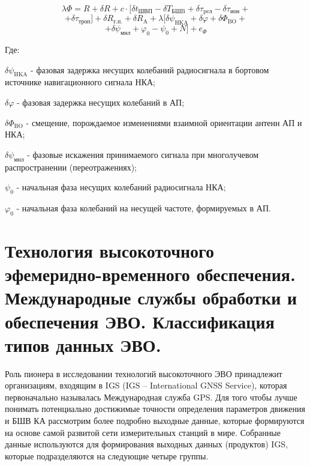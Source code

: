 \documentclass[14pt,a4paper,oneside]{extarticle}
\begin{document}
\[\lambda\Phi=R+\delta R+c\cdot[\delta t_{\text{ШВП}}-\delta T_{\text{БШB}}+\delta\tau_{\text{peл}}-\delta\tau_{\text{ион}}+\]
        \[+\delta\tau_{\text{троп}}]+\delta R_{\text{г.п.}}+\delta R_{\text{A}}+\lambda[\delta\psi_{\text{HKA}}+\delta\varphi+\delta\Phi_{\text{BO}}+\]
        \[+\delta\psi_{\text{мнл}}+\varphi_{0}-\psi_{0}+N]+e_{\Phi}\]

Где:

$\delta\psi_{\text{HKA}}$ - фазовая задержка несущих колебаний радиосигнала в бортовом источнике навигационного сигнала НКА;

$\delta\varphi$ - фазовая задержка несущих колебаний в АП;

$\delta\Phi_{\text{BO}}$ - смещение, порождаемое изменениями взаимной ориентации антенн АП и НКА;

$\delta\psi_{\text{мнл}}$ - фазовые искажения принимаемого сигнала при многолучевом распространении (переотражениях);

$\psi_{0}$ - начальная фаза несущих колебаний радиосигнала НКА;

$\varphi_{0}$ - начальная фаза колебаний на несущей частоте, формируемых в АП.

\section{Технология высокоточного эфемеридно-временного обеспечения. Международные службы обработки и обеспечения ЭВО. Классификация типов данных ЭВО.}

Роль пионера в исследовании технологий высокоточного ЭВО принадлежит организациям, входящим в IGS (IGS -- International GNSS Service), которая первоначально называлась Международная служба GPS. Для того чтобы лучше понимать потенциально достижимые точности определения параметров движения и БШВ КА рассмотрим более подробно выходные данные, которые формируются на основе самой развитой сети измерительных станций в мире. Собранные данные используются для формирования выходных данных (продуктов) IGS, которые подразделяются на следующие четыре группы.
\end{document}
